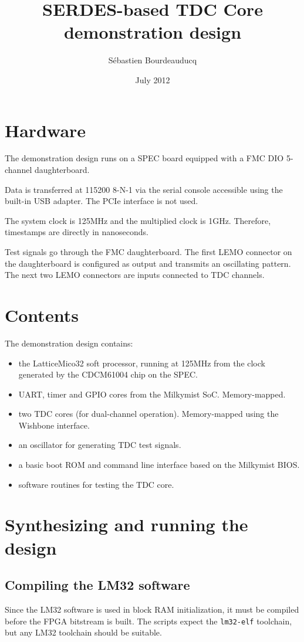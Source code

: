 \documentclass[a4paper,11pt]{article}
\title{SERDES-based TDC Core demonstration design}
\author{S\'ebastien Bourdeauducq}
\date{July 2012}
\begin{document}
\setlength{\parindent}{0pt}
\setlength{\parskip}{5pt}
\maketitle{}
\section{Hardware}
The demonstration design runs on a SPEC board equipped with a FMC DIO 5-channel daughterboard.

Data is transferred at 115200 8-N-1 via the serial console accessible using the built-in USB adapter. The PCIe interface is not used.

The system clock is 125MHz and the multiplied clock is 1GHz. Therefore, timestamps are directly in nanoseconds.

Test signals go through the FMC daughterboard. The first LEMO connector on the daughterboard is configured as output and transmits an oscillating pattern. The next two LEMO connectors are inputs connected to TDC channels.

\section{Contents}
The demonstration design contains:
\begin{itemize}
\item the LatticeMico32 soft processor, running at 125MHz from the clock generated by the CDCM61004 chip on the SPEC.
\item UART, timer and GPIO cores from the Milkymist SoC. Memory-mapped.
\item two TDC cores (for dual-channel operation). Memory-mapped using the Wishbone interface.
\item an oscillator for generating TDC test signals.
\item a basic boot ROM and command line interface based on the Milkymist BIOS.
\item software routines for testing the TDC core.
\end{itemize}

\section{Synthesizing and running the design}
\subsection{Compiling the LM32 software}
Since the LM32 software is used in block RAM initialization, it must be compiled before the FPGA bitstream is built. The scripts expect the \verb!lm32-elf! toolchain, but any LM32 toolchain should be suitable.
\end{document}
